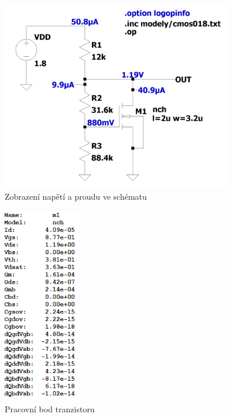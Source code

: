 \vspace{10mm}
\begin{figure}[h!]
    \centering
    \includegraphics[width=0.9\textwidth]{text/img/NR-op-sch.png}
    \caption{\label{fig:NR-op-sch} Zobrazení napětí a proudu ve schématu}
\end{figure}

\vspace{10mm}
\begin{figure}[h!]
    \centering
    \includegraphics[width=0.3\textwidth]{text/img/NR-op-ol.png}
    \caption{\label{fig:NR-op-ol} Pracovní bod tranzistoru}
\end{figure}

